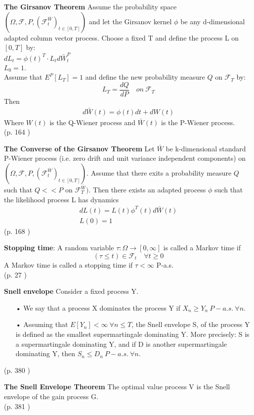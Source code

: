 \begin{theorem}\label{Girsanov}
\textbf{The Girsanov Theorem} 
Assume the probability space $(\Omega, \mathcal{F}, P, (\mathcal{F}_t^{\bar{W}})_{t \in [0,T]})$ and let the Girsanov kernel $\phi$ be any d-dimensional adapted column vector process. Choose a fixed T and define the process L on $[0,T]$ by:\\
$dL_t=\phi(t)^T\cdot L_t d\bar{W}_t^P$\\
$L_0=1$.\\
Assume that $E^P[L_T]=1$ and define the new probability measure $Q$ on $\mathcal{F}_T$ by:\\
$$L_T=\frac{dQ}{dP} \quad on \ \mathcal{F}_T$$
Then
\begin{align}
d\bar{W}(t)=\phi(t)dt + dW(t)
\end{align}
Where $W(t)$ is the Q-Wiener process and $\bar{W}(t)$ is the P-Wiener process.\\
\null \hfill (p. 164 \parencite{finKont})
\end{theorem}

\begin{theorem}\label{ConverseGirsanov}
\textbf{The Converse of the Girsanov Theorem} Let $\bar{W}$ be k-dimensional standard P-Wiener process (i.e. zero drift and unit variance independent components) on $(\Omega,\mathcal{F}, P, (\mathcal{F}_t^{\bar{W}})_{t \in [0,T]})$. Assume that there exits a probability measure $Q$ such that $Q<<P$ on $\mathcal{F}_T^{\bar{W}})$. Then there exists an adapted process $\phi$ such that the likelihood process L has dynamics
\begin{align*}
dL(t)=L(t)\phi^T(t)d\bar{W}(t)\\
L(0)=1
\end{align*}
\null \hfill (p. 168 \parencite{finKont})
\end{theorem}

\theoremstyle{definition}
\begin{definition}{\textbf{Stopping time}:}\label{StoppingTime}
A random variable $\tau:\Omega \to [0,\infty]$ is called a Markov time if 
$$(\tau \leq t)\in \mathcal{F}_{t} \quad \forall t \geq 0 $$
A Markov time is called a stopping time if $\tau<\infty$ P-a.s.\\
\null \hfill (p. 27 \parencite{Shiryaev06})
\end{definition}


\theoremstyle{definition}
\begin{definition}{\textbf{Snell envelope}}\label{snellEnvelope}
Consider a fixed process Y.
\begin{enumerate}
\item[•] We say that a process X dominates the process Y if $X_n \geq Y_n \ P-a.s. \ \forall n$.
\item[•] Assuming that $E[Y_n] < \infty  \ \forall n \leq T$, the Snell envelope S, of the process Y is defined as the smallest supermartingale dominating Y. More precisely: S is a supermartingale dominating Y, and if D is another supermartingale dominating Y, then $S_n\leq D_n \ P-a.s. \ \forall n$.
\end{enumerate}
\null \hfill (p. 380 \parencite{Bjork19})
\end{definition}

\begin{theorem}\label{SnellEnvelopeTheorem}
\textbf{The Snell Envelope Theorem} The optimal value process V is the Snell envelope of the gain process G.\\
\null \hfill (p. 381  \parencite{Bjork19})
\end{theorem}
